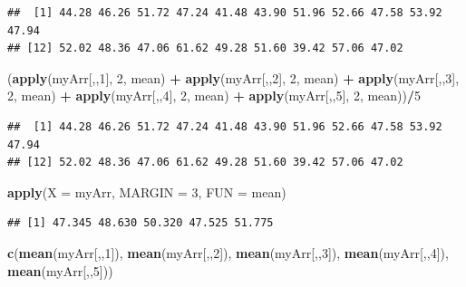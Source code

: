 \documentclass[]{book}
\newenvironment{Shaded}{\begin{snugshade}}{\end{snugshade}}
\newcommand{\DataTypeTok}[1]{\textcolor[rgb]{0.13,0.29,0.53}{#1}}
\newcommand{\DecValTok}[1]{\textcolor[rgb]{0.00,0.00,0.81}{#1}}
\newcommand{\KeywordTok}[1]{\textcolor[rgb]{0.13,0.29,0.53}{\textbf{#1}}}
\newcommand{\NormalTok}[1]{#1}
\newcommand{\OperatorTok}[1]{\textcolor[rgb]{0.81,0.36,0.00}{\textbf{#1}}}
\newcommand{\StringTok}[1]{\textcolor[rgb]{0.31,0.60,0.02}{#1}}
\begin{document}
\begin{verbatim}
##  [1] 44.28 46.26 51.72 47.24 41.48 43.90 51.96 52.66 47.58 53.92 47.94
## [12] 52.02 48.36 47.06 61.62 49.28 51.60 39.42 57.06 47.02
\end{verbatim}

\begin{Shaded}
\begin{Highlighting}[]
\NormalTok{(}\KeywordTok{apply}\NormalTok{(myArr[,,}\DecValTok{1}\NormalTok{], }\DecValTok{2}\NormalTok{, mean) }\OperatorTok{+}\StringTok{ }\KeywordTok{apply}\NormalTok{(myArr[,,}\DecValTok{2}\NormalTok{], }\DecValTok{2}\NormalTok{, mean) }\OperatorTok{+}\StringTok{ }
\StringTok{  }\KeywordTok{apply}\NormalTok{(myArr[,,}\DecValTok{3}\NormalTok{], }\DecValTok{2}\NormalTok{, mean) }\OperatorTok{+}\StringTok{ }\KeywordTok{apply}\NormalTok{(myArr[,,}\DecValTok{4}\NormalTok{], }\DecValTok{2}\NormalTok{, mean) }\OperatorTok{+}\StringTok{ }
\StringTok{  }\KeywordTok{apply}\NormalTok{(myArr[,,}\DecValTok{5}\NormalTok{], }\DecValTok{2}\NormalTok{, mean))}\OperatorTok{/}\DecValTok{5}
\end{Highlighting}
\end{Shaded}

\begin{verbatim}
##  [1] 44.28 46.26 51.72 47.24 41.48 43.90 51.96 52.66 47.58 53.92 47.94
## [12] 52.02 48.36 47.06 61.62 49.28 51.60 39.42 57.06 47.02
\end{verbatim}

\begin{Shaded}
\begin{Highlighting}[]
\KeywordTok{apply}\NormalTok{(}\DataTypeTok{X =}\NormalTok{ myArr, }\DataTypeTok{MARGIN =} \DecValTok{3}\NormalTok{, }\DataTypeTok{FUN =}\NormalTok{ mean)}
\end{Highlighting}
\end{Shaded}

\begin{verbatim}
## [1] 47.345 48.630 50.320 47.525 51.775
\end{verbatim}

\begin{Shaded}
\begin{Highlighting}[]
\KeywordTok{c}\NormalTok{(}\KeywordTok{mean}\NormalTok{(myArr[,,}\DecValTok{1}\NormalTok{]), }\KeywordTok{mean}\NormalTok{(myArr[,,}\DecValTok{2}\NormalTok{]), }\KeywordTok{mean}\NormalTok{(myArr[,,}\DecValTok{3}\NormalTok{]), }
  \KeywordTok{mean}\NormalTok{(myArr[,,}\DecValTok{4}\NormalTok{]), }\KeywordTok{mean}\NormalTok{(myArr[,,}\DecValTok{5}\NormalTok{]))}
\end{Highlighting}
\end{Shaded}
\end{document}
